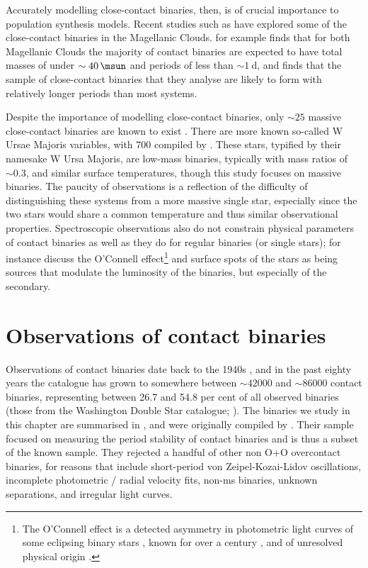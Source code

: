 Accurately modelling close-contact binaries, then, is of crucial importance to population synthesis models. Recent studies such as \citet{Menon:2021, Abdul-masih:2022, Sen:2022} have explored some of the close-contact binaries in the Magellanic Clouds. \citet{Menon:2021} for example finds that for both Magellanic Clouds the majority of contact binaries are expected to have total masses of under $\sim\SI{40}{\msun}$ and periods of less than $\sim\SI{1}{\day}$, and \citet{Abdul-masih:2022} finds that the sample of close-contact binaries that they analyse are likely to form with relatively longer periods than most systems.

Despite the importance of modelling close-contact binaries, only $\sim25$ massive close-contact binaries are known to exist \citep{Abdul-masih:2023}. There are more known so-called W Ursae Majoris variables, with 700 compiled by \citet{Latkovic:2021}. These stars, typified by their namesake W Ursa Majoris, are low-mass binaries, typically with mass ratios of $\sim0.3$, and similar surface temperatures, though this study focuses on massive binaries. The paucity of observations is a reflection of the difficulty of distinguishing these systems from a more massive single star, especially since the two stars would share a common temperature \citep{Kuiper:1941, Latkovic:2021} and thus similar observational properties. Spectroscopic observations also do not constrain physical parameters of contact binaries as well as they do for regular binaries (or single stars); for instance \citet{Gazeas:2021} discuss the O'Connell effect\footnote{The O'Connell effect is a detected asymmetry in photometric light curves of some eclipsing binary stars \citep{O'Connell:1951}, known for over a century \citep{Roberts:1906}, and of unresolved physical origin \citep[][and references therein]{FloresCabrera:2025, Zhou:2026}.} and surface spots of the stars as being sources that modulate the luminosity of the binaries, but especially of the secondary.

\section{Observations of contact binaries}

\alice

Observations of contact binaries date back to the 1940s \citep{Kuiper:1941}, and in the past eighty years the catalogue has grown to somewhere between $\sim\num{42000}$ \citep{Petrosky:2021} and $\sim\num{86000}$ \citep{Qian:2020} contact binaries, representing between 26.7 and 54.8 per cent of all observed binaries (those from the Washington Double Star catalogue; \citealt{Mason:2001}). The binaries we study in this chapter are summarised in , and were originally compiled by \citet{Abdul-masih:2022}. Their sample focused on measuring the period stability of contact binaries and is thus a subset of the known sample. They rejected a handful of other non O+O overcontact binaries, for reasons that include short-period von Zeipel-Kozai-Lidov oscillations, incomplete photometric / radial velocity fits, non-\gls{ms} binaries, unknown separations, and irregular light curves.

